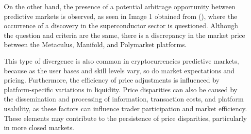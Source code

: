 On the other hand, the presence of a potential arbitrage opportunity between predictive markets is observed, as seen in Image 1 obtained from (\citeauthor{lPolack}), where the occurrence of a discovery in the superconductor sector is questioned. Although the question and criteria are the same, there is a discrepancy in the market price between the Metaculus, Manifold, and Polymarket platforms.

    \begin{center}
    \end{center}

This type of divergence is also common in cryptocurrencies predictive markets, because as the user bases and skill levels vary, so do market expectations and pricing. Furthermore, the efficiency of price adjustments is influenced by platform-specific variations in liquidity. Price disparities can also be caused by the dissemination and processing of information, transaction costs, and platform usability, as these factors can influence trader participation and market efficiency. These elements may contribute to the persistence of price disparities, particularly in more closed markets.
